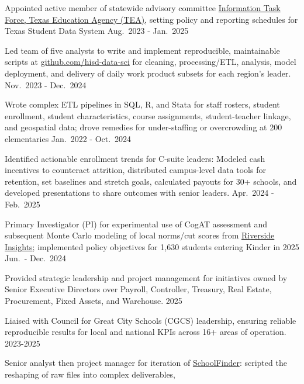 \documentclass[
  11pt,
]
{article}
\renewenvironment{itemize}{
  \begin{list}{}{
    \setlength{\leftmargin}{1.5em}
  }
}{
  \end{list}
}
\begin{document}
\begin{itemize}
\item
  Appointed active member of statewide advisory committee
  \href{https://www.texasstudentdatasystem.org/TSDS/About/Data_Governance/User_Involvement_and_Data_Governance}{Information
  Task Force, Texas Education Agency (TEA)}, setting policy and
  reporting schedules for Texas Student Data System \hfill Aug.~2023 -
  Jan.~2025
\item
  Led team of five analysts to write and implement reproducible,
  maintainable scripts at
  \href{https://github.com/}{github.com/hisd-data-sci} for cleaning,
  processing/ETL, analysis, model deployment, and delivery of daily work
  product subsets for each region's leader. \hfill Nov.~2023 - Dec.~2024
\item
  Wrote complex ETL pipelines in SQL, R, and Stata for staff rosters,
  student enrollment, student characteristics, course assignments,
  student-teacher linkage, and geospatial data; drove remedies for
  under-staffing or overcrowding at 200 elementaries \hfill Jan.~2022 -
  Oct.~2024
\item
  Identified actionable enrollment trends for C-suite leaders: Modeled
  cash incentives to counteract attrition, distributed campus-level data
  tools for retention, set baselines and stretch goals, calculated
  payouts for 30+ schools, and developed presentations to share outcomes
  with senior leaders. \hfill Apr.~2024 - Feb.~2025
\item
  Primary Investigator (PI) for experimental use of CogAT assessment and
  subsequent Monte Carlo modeling of local norms/cut scores from
  \href{https://riversideinsights.com/cognitive_abilities_test}{Riverside
  Insights}; implemented policy objectives for 1,630 students entering
  Kinder in 2025 \hfill Jun.~- Dec.~2024
\item
  Provided strategic leadership and project management for initiatives
  owned by Senior Executive Directors over Payroll, Controller,
  Treasury, Real Estate, Procurement, Fixed Assets, and Warehouse.
  \hfill 2025
\item
  Liaised with Council for Great City Schools (CGCS) leadership,
  ensuring reliable reproducible results for local and national KPIs
  across 16+ areas of operation. \hfill 2023-2025
\item
  Senior analyst then project manager for iteration of
  \href{https://schoolfinder.houstonisd.org/Dashboard/module-resource/school-finder}{SchoolFinder}:
  scripted the reshaping of raw files into complex deliverables,

\end{itemize}
\end{document}
